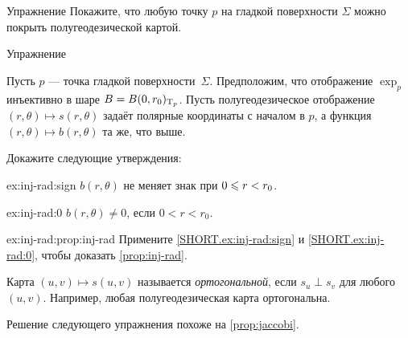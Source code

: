 \begin{thm}{Упражнение}\label{ex:semigeodesc-chart}
Покажите, что любую точку $p$ на гладкой поверхности $\Sigma$ можно покрыть полугеодезической картой.
\end{thm}

\begin{thm}{Упражнение}\label{ex:inj-rad}
{\sloppy
Пусть $p$ --- точка гладкой поверхности~$\Sigma$.
Предположим, что отображение $\exp_p$ инъективно в шаре $B\z=B(0,r_0)_{\T_p}$.
Пусть полугеодезическое отображение $(r,\theta)\mapsto s(r,\theta)$ задаёт полярные координаты с началом в $p$, а функция $(r,\theta)\mapsto b(r,\theta)$ та же, что выше.

}

Докажите следующие утверждения:

\begin{subthm}{ex:inj-rad:sign}
$b(r,\theta)$ не меняет знак при $0\z\le r\z<r_0$.
\end{subthm}

\begin{subthm}{ex:inj-rad:0}
$b(r,\theta)\ne0$, если $0< r<r_0$.
\end{subthm}

\begin{subthm}{ex:inj-rad:prop:inj-rad}
Примените \ref{SHORT.ex:inj-rad:sign} и \ref{SHORT.ex:inj-rad:0}, чтобы доказать \ref{prop:inj-rad}.
\end{subthm}
 
\end{thm}


Карта $(u,v)\mapsto s(u,v)$ называется \emph{ортогональной}, если $s_u\perp s_v$ для любого $(u,v)$.
Например, любая полугеодезическая карта ортогональна.

Решение следующего упражнения похоже на \ref{prop:jaccobi}.

